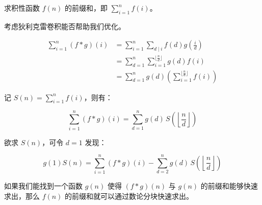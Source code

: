 求积性函数 $f(n)$ 的前缀和，即 $\sum\limits_{i = 1}^{n} f(i)$。

考虑狄利克雷卷积能否帮助我们优化。

\[
\begin{aligned}
\sum_{i = 1}^{n}(f * g)(i) &= \sum_{i = 1}^{n}\sum_{d \mid i}f(d)g\left(\frac{i}{d}\right) \\
&= \sum_{d = 1}^{n}\sum_{i = 1}^{\lfloor\frac{n}{d}\rfloor} g(d) f(i) \\
&= \sum_{d = 1}^{n} g(d) \left( \sum_{i = 1}^{\lfloor\frac{n}{d}\rfloor} f(i) \right)
\end{aligned}
\]

记 $S(n) = \sum\limits_{i = 1}^{n} f(i)$，则有：

\[
\sum_{i = 1}^{n}(f * g)(i) = \sum_{d = 1}^{n} g(d) \, S\!\left( \left\lfloor \frac{n}{d} \right\rfloor \right)
\]

欲求 $S(n)$，可令 $d = 1$ 发现：

\[
g(1) S(n) = \sum_{i = 1}^{n} (f * g)(i) - \sum_{d = 2}^{n} g(d) \, S\!\left( \left\lfloor \frac{n}{d} \right\rfloor \right)
\]

如果我们能找到一个函数 $g(n)$ 使得 $(f * g)(n)$ 与 $g(n)$ 的前缀和能够快速求出，那么 $f(n)$ 的前缀和就可以通过数论分块快速求出。
